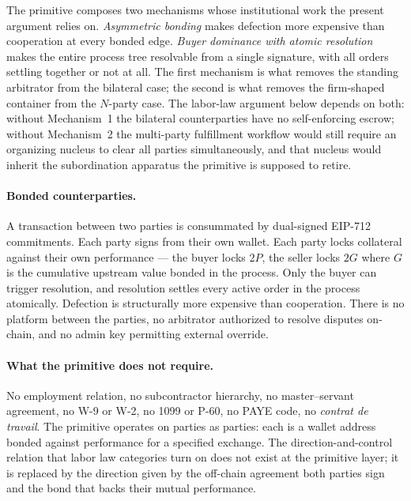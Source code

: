 \documentclass[11pt,a4paper]{article}
\theoremstyle{remark}
\begin{document}
The primitive composes two mechanisms whose institutional work the
present argument relies on. \emph{Asymmetric bonding} makes
defection more expensive than cooperation at every bonded edge.
\emph{Buyer dominance with atomic resolution} makes the entire
process tree resolvable from a single signature, with all orders
settling together or not at all. The first mechanism is what
removes the standing arbitrator from the bilateral case; the
second is what removes the firm-shaped container from the
$N$-party case. The labor-law argument below depends on both:
without Mechanism~1 the bilateral counterparties have no
self-enforcing escrow; without Mechanism~2 the multi-party
fulfillment workflow would still require an organizing nucleus
to clear all parties simultaneously, and that nucleus would
inherit the subordination apparatus the primitive is supposed
to retire.

\paragraph{Bonded counterparties.}
A transaction between two parties is consummated by dual-signed
EIP-712 commitments. Each party signs from their own wallet. Each
party locks collateral against their own performance --- the buyer
locks $2P$, the seller locks $2G$ where $G$ is the cumulative
upstream value bonded in the process. Only the buyer can trigger
resolution, and resolution settles every active order in the
process atomically. Defection is structurally more expensive than
cooperation. There is no platform between the parties, no
arbitrator authorized to resolve disputes on-chain, and no admin
key permitting external override.

\paragraph{What the primitive does not require.}
No employment relation, no subcontractor hierarchy, no master--servant
agreement, no W-9 or W-2, no 1099 or P-60, no PAYE code, no
\emph{contrat de travail}. The primitive operates on parties as
parties: each is a wallet address bonded against performance for a
specified exchange. The direction-and-control relation that labor
law categories turn on does not exist at the primitive layer; it is
replaced by the direction given by the off-chain agreement both
parties sign and the bond that backs their mutual performance.

\end{document}
